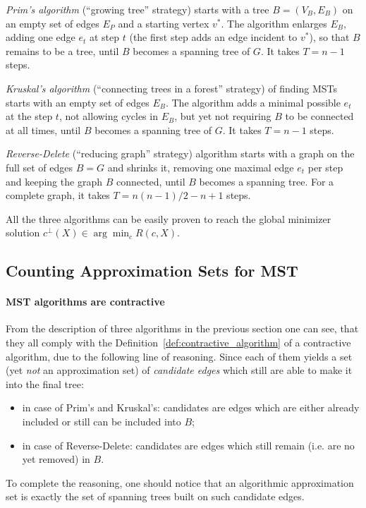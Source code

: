 \emph{Prim's algorithm} (``growing tree'' strategy) starts with a tree $B=(V_B,
E_B)$ on an empty set of edges $E_P$ and a starting vertex $v^{*}$. The
algorithm enlarges $E_B$, adding one edge $e_t$ at step $t$ (the first step
adds an edge incident to $v^{*}$), so that $B$ remains to be a tree, until $B$
becomes a spanning tree of $G$. It takes $T = n-1$ steps.

\emph{Kruskal's algorithm} (``connecting trees in a forest'' strategy) of
finding MSTs starts with an empty set of edges $E_B$. The algorithm adds
a minimal possible $e_t$ at the step $t$, not allowing cycles in $E_B$,
but yet not requiring $B$ to be connected at all times, until $B$ becomes a spanning tree
of $G$. It takes $T = n-1$ steps.

\emph{Reverse-Delete} (``reducing graph'' strategy) algorithm starts
with a graph on the full set of edges $B = G$ and shrinks it, removing one maximal edge
$e_t$ per step and keeping the graph
$B$ connected, until $B$ becomes a spanning tree. 
For a complete graph, it takes $T = n(n-1)/2 - n + 1$ steps.

\myremark All the three algorithms can be easily proven to reach the global
minimizer solution $c^\bot(X) \in \arg \min_c R(c, X)$.

\subsection{Counting Approximation Sets for MST}

\paragraph{MST algorithms are contractive} From the description of three
algorithms in the previous section one can see, that they all comply with the
Definition~\ref{def:contractive_algorithm} of a contractive algorithm, due to
the following line of reasoning. Since each of them yields a set (yet
\textit{not} an approximation set) of \textit{candidate edges} which still are
able to make it into the final tree:
\begin{itemize}
  \item in case of Prim's and Kruskal's: candidates are edges which are
    either already included or still can be included into $B$;
  \item in case of Reverse-Delete: candidates are edges which still remain (i.e.
    are no yet removed) in $B$.
\end{itemize}
To complete the reasoning, one should notice that an algorithmic approximation
set is exactly the set of spanning trees built on such candidate edges.

